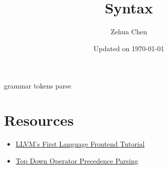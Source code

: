\documentclass{report}
\title{Syntax}
\author{Zehua Chen}
\date{Updated on \today}
\begin{document}
  \maketitle
  \tableofcontents

  {grammar}
  {tokens}
  {parse}

  \chapter{Resources}

    \begin{itemize}
      \item \href{https://llvm.org/docs/tutorial/MyFirstLanguageFrontend/index.html}
      {LLVM's First Language Frontend Tutorial}
      \item \href{https://eli.thegreenplace.net/2010/01/02/top-down-operator-precedence-parsing}
      {Top Down Operator Precedence Parsing}
    \end{itemize}
\end{document}
